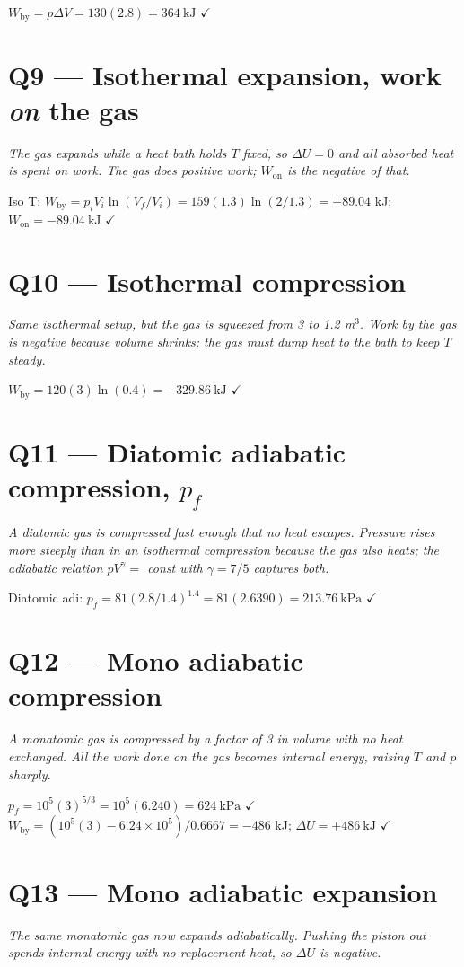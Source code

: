 \documentclass[11pt]{article}
\newcommand{\checkmk}{\ensuremath{\checkmark}}
\begin{document}
$W_{\text{by}} = p\Delta V = 130(2.8) = \boxed{364\ \text{kJ}}$ \checkmk

\section*{Q9 --- Isothermal expansion, work \emph{on} the gas}
\emph{The gas expands while a heat bath holds $T$ fixed, so $\Delta U = 0$ and all absorbed heat is spent on work. The gas does positive work; $W_{\text{on}}$ is the negative of that.}

Iso T: $W_{\text{by}} = p_iV_i\ln(V_f/V_i) = 159(1.3)\ln(2/1.3) = +89.04$ kJ; $W_{\text{on}} = \boxed{-89.04\ \text{kJ}}$ \checkmk

\section*{Q10 --- Isothermal compression}
\emph{Same isothermal setup, but the gas is squeezed from 3 to 1.2 m$^3$. Work by the gas is negative because volume shrinks; the gas must dump heat to the bath to keep $T$ steady.}

$W_{\text{by}} = 120(3)\ln(0.4) = \boxed{-329.86\ \text{kJ}}$ \checkmk

\section*{Q11 --- Diatomic adiabatic compression, $p_f$}
\emph{A diatomic gas is compressed fast enough that no heat escapes. Pressure rises more steeply than in an isothermal compression because the gas also heats; the adiabatic relation $pV^\gamma = $ const with $\gamma = 7/5$ captures both.}

Diatomic adi: $p_f = 81(2.8/1.4)^{1.4} = 81(2.6390) = \boxed{213.76\ \text{kPa}}$ \checkmk

\section*{Q12 --- Mono adiabatic compression}
\emph{A monatomic gas is compressed by a factor of 3 in volume with no heat exchanged. All the work done on the gas becomes internal energy, raising $T$ and $p$ sharply.}

$p_f = 10^5(3)^{5/3} = 10^5(6.240) = \boxed{624\ \text{kPa}}$ \checkmk
$W_{\text{by}} = (10^5(3) - 6.24\times10^5)/0.6667 = -486$ kJ; $\Delta U = \boxed{+486\ \text{kJ}}$ \checkmk

\section*{Q13 --- Mono adiabatic expansion}
\emph{The same monatomic gas now expands adiabatically. Pushing the piston out spends internal energy with no replacement heat, so $\Delta U$ is negative.}
\end{document}
